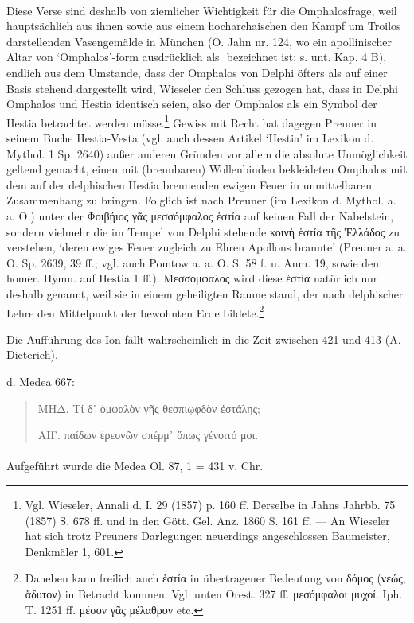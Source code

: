 \documentclass[a4paper, 11pt, oneside]{article}
\newcommand*\svgAAL{}
\begin{document}
\paragraph{}
Diese Verse sind deshalb von ziemlicher Wichtigkeit für die Omphalosfrage, weil hauptsächlich aus ihnen sowie aus einem hocharchaischen den Kampf um Troilos darstellenden Vasengemälde in München (O. Jahn nr. 124, wo ein apollinischer Altar von `Omphalos'-form ausdrücklich als $\svgAAL$ bezeichnet ist; s. unt. Kap. 4 B), endlich aus dem Umstande, dass der Omphalos von Delphi öfters als auf einer Basis stehend dargestellt wird, Wieseler den Schluss gezogen hat, dass in Delphi Omphalos und Hestia identisch seien, also der Omphalos als ein Symbol der Hestia betrachtet werden müsse.\footnote{Vgl. Wieseler, Annali d. I. 29 (1857) p. 160 ff. Derselbe in Jahns Jahrbb. 75 (1857) S. 678 ff. und in den Gött. Gel. Anz. 1860 S. 161 ff. --- An Wieseler hat sich trotz Preuners Darlegungen neuerdings angeschlossen Baumeister, Denkmäler 1, 601.} Gewiss mit Recht hat dagegen Preuner in seinem Buche Hestia-Vesta (vgl. auch dessen Artikel `Hestia' im Lexikon d. Mythol. 1 Sp. 2640) außer anderen Gründen vor allem die absolute Unmöglichkeit geltend gemacht, einen mit (brennbaren) Wollenbinden bekleideten Omphalos mit dem auf der delphischen Hestia brennenden ewigen Feuer in unmittelbaren Zusammenhang zu bringen. Folglich ist nach Preuner (im Lexikon d. Mythol. a. a. O.) unter der Φοιβήιος γᾶς μεσσόμφαλος ἑστία auf keinen Fall der Nabelstein, sondern vielmehr die im Tempel von Delphi stehende κοινὴ ἑστία τῆς Ἑλλάδος zu verstehen, `deren ewiges Feuer zugleich zu Ehren Apollons brannte' (Preuner a. a. O. Sp. 2639, 39 ff.; vgl. auch Pomtow a. a. O. S. 58 f. u. Anm. 19, sowie den homer. Hymn. auf Hestia 1 ff.). Μεσσόμφαλος wird diese ἑστία natürlich nur deshalb genannt, weil sie in einem geheiligten Raume stand, der nach delphischer Lehre den Mittelpunkt der bewohnten Erde bildete.\footnote{Daneben kann freilich auch ἑστία in übertragener Bedeutung von δόμος (νεώς, ἄδυτον) in Betracht kommen. Vgl. unten Orest. 327 ff. μεσόμφαλοι μυχοί. Iph. T. 1251 ff. μέσον γᾶς μέλαθρον etc.}

Die Aufführung des Ion fällt wahrscheinlich in die Zeit zwischen 421 und 413 (A. Dieterich).

d. Medea 667:
\begin{quotation}
ΜΗΔ. Τί δ᾽ ὀμφαλὸν γῆς θεσπιῳφδὸν ἐστάλης;

ΑΙΓ. παίδων ἐρευνῶν σπέρμ᾽ ὅπως γένοιτό μοι.
\end{quotation}
\paragraph{}
Aufgeführt wurde die Medea Ol. 87, 1 = 431 v. Chr.
\end{document}

